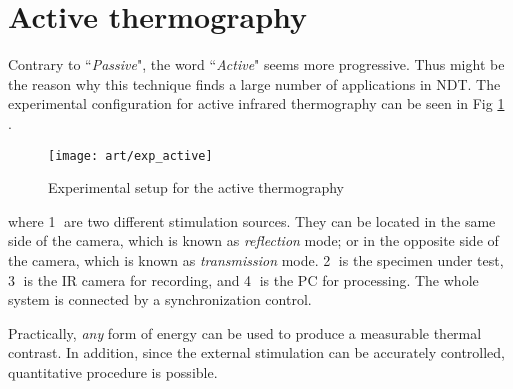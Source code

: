\section{Active thermography}
Contrary to ``\textit{Passive}", the word ``\textit{Active}" seems more progressive. Thus might be the reason why this technique finds a large number of applications in NDT. The experimental configuration for active infrared thermography can be seen in Fig \ref{exp_active} \citep{sfarra2010comparative}. 
\begin{figure}[!htbp]
	\centering
	\texttt{[image: art/exp\_active]}
	\caption{Experimental setup for the active thermography}
	\label{exp_active}
\end{figure}
where \textcircled{1} are two different stimulation sources. They can be located in the same side of the camera, which is known as \textit{reflection} mode; or in the opposite side of the camera, which is known as \textit{transmission} mode.  \textcircled{2} is the specimen under test, \textcircled{3} is the IR camera for recording, and \textcircled{4} is the PC for processing. The whole system is connected by a synchronization control.

Practically, \textit{any} form of energy can be used to produce a measurable thermal contrast. In addition, since the external stimulation can be accurately controlled, quantitative procedure is possible. 

